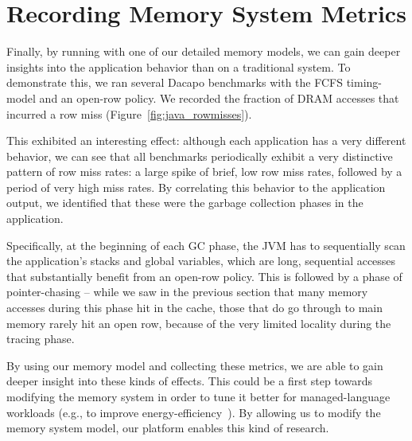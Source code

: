 \section{Recording Memory System Metrics}

Finally, by running with one of our detailed memory models, we can gain deeper
insights into the application behavior than on a traditional system. To
demonstrate this, we ran several Dacapo benchmarks with the FCFS timing-model
and an open-row policy. We recorded the fraction of DRAM accesses that incurred
a row miss (Figure~\ref{fig:java_rowmisses}).

This exhibited an interesting effect: although each application has a very
different behavior, we can see that all benchmarks periodically exhibit a very
distinctive pattern of row miss rates: a large spike of brief, low row miss
rates, followed by a period of very high miss rates. By correlating this
behavior to the application output, we identified that these were the garbage
collection phases in the application.

Specifically, at the beginning of each GC phase, the JVM has to sequentially
scan the application's stacks and global variables, which are long, sequential
accesses that substantially benefit from an open-row policy. This is followed
by a phase of pointer-chasing -- while we saw in the previous section that many
memory accesses during this phase hit in the cache, those that do go through to
main memory rarely hit an open row, because of the very limited locality during
the tracing phase.

By using our memory model and collecting these metrics, we are able to gain
deeper insight into these kinds of effects. This could be a first step towards
modifying the memory system in order to tune it better for managed-language
workloads (e.g., to improve
energy-efficiency~\cite{Cao:2012:YYP:2337159.2337185}). By allowing us to
modify the memory system model, our platform enables this kind of research.
